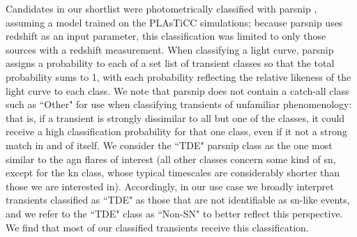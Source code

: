 \documentclass[twocolumn]{aastex631}
\begin{document}
Candidates in our shortlist were photometrically classified with \gls{parsnip} \citep{booneParSNIPGenerativeModels2021}, assuming a model trained on the PLAsTiCC \citep{Kessler_2019} simulations; because \gls{parsnip} uses redshift as an input parameter, this classification was limited to only those sources with a redshift measurement.
When classifying a light curve, \gls{parsnip} assigns a probability to each of a set list of transient classes so that  the total probability sums to 1, with each probability reflecting the relative likeness of the light curve to each class.
We note that \gls{parsnip} does not contain a catch-all class such as ``Other" for use when classifying transients of unfamiliar phenomenology: that is, if a transient is strongly dissimilar to all but one of the classes, it could receive a high classification probability for that one class, even if it not a strong match in and of itself.
We consider the ``TDE" \gls{parsnip} class as the one most similar to the \gls{agn} flares of interest (all other classes concern some kind of \gls{sn}, except for the \gls{kn} class, whose typical timescales are considerably shorter than those we are interested in).
Accordingly, in our use case we broadly interpret transients classified as ``TDE" as those that are not identifiable as \gls{sn}-like events, and we refer to the ``TDE" class as ``Non-SN" to better reflect this perspective.
We find that most of our classified transients receive this classification.
\end{document}
